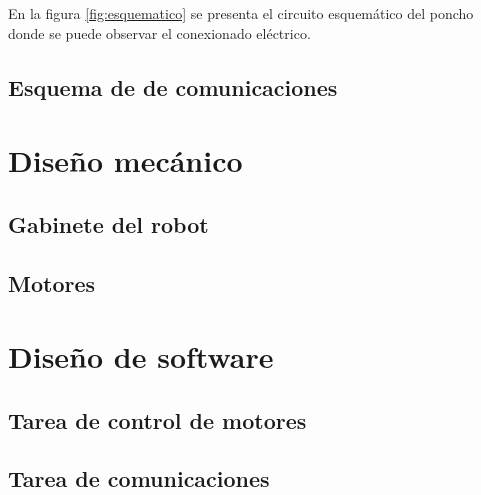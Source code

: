 En la figura \ref{fig:esquematico} se presenta el circuito esquemático del poncho donde se puede observar el conexionado eléctrico.


\subsection{Esquema de  de comunicaciones}

\section{Diseño mecánico}
\subsection{Gabinete del robot}
\subsection{Motores}

\section{Diseño de software}
\subsection{Tarea de control de motores}
\subsection{Tarea de comunicaciones}







%
%
%
%
%
%
%
%
%
%
%	
%		
%
%		
%		
%		
%		



